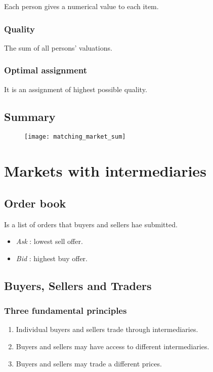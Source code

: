 Each person gives a numerical value to each item.

\subsubsection{Quality}

The sum of all persons' valuations.

\subsubsection{Optimal assignment}

It is an assignment of highest possible quality.

\subsection{Summary}

\begin{figure}[H]
    \centering
    \texttt{[image: matching\_market\_sum]}
\end{figure}

\section{Markets with intermediaries}

\subsection{Order book}

Is a list of orders that buyers and sellers hae submitted.

\begin{itemize}
\item \textit{Ask} : lowest sell offer.
\item \textit{Bid} : highest buy offer.
\end{itemize}

\subsection{Buyers, Sellers and Traders}

\subsubsection{Three fundamental principles}

\begin{enumerate}
\item Individual buyers and sellers trade through intermediaries.
\item Buyers and sellers may have access to different intermediaries.
\item Buyers and sellers may trade a different prices.
\end{enumerate}

